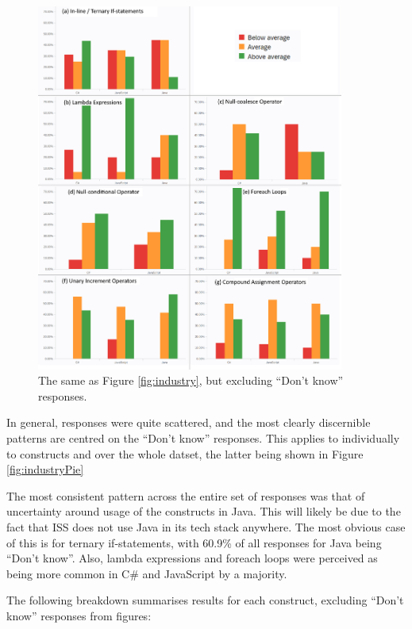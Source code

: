\documentclass{article}
\begin{document}
            \begin{figure}[htbp]
                \centering
                \includegraphics[width=0.9\textwidth]{industryExcl}
                \caption{The same as Figure \ref{fig:industry}, but excluding ``Don't know'' responses.}
                \label{fig:industryExcl}
            \end{figure}

            In general, responses were quite scattered, and the most clearly discernible patterns are centred on the ``Don't know'' responses. This applies to individually to constructs and over the whole datset, the latter being shown in Figure \ref{fig:industryPie}

            The most consistent pattern across the entire set of responses was that of uncertainty around usage of the constructs in Java. This will likely be due to the fact that ISS does not use Java in its tech stack anywhere. The most obvious case of this is for ternary if-statements, with 60.9\% of all responses for Java being ``Don't know''. Also, lambda expressions and foreach loops were perceived as being more common in C\# and JavaScript by a majority.

            The following breakdown summarises results for each construct, excluding ``Don't know'' responses from figures:
            
\end{document}
